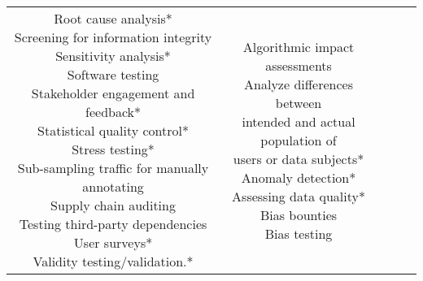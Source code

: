 \documentclass[fleqn]{article}
\begin{document}
\begin{landscape}
\begin{table}[H]
\begin{tabular}{|c|c|c|c|c|}
{			\textbullet\hspace{3pt} Root cause analysis*\\ 
			\textbullet\hspace{3pt} Screening for information integrity \\ 
			\textbullet\hspace{3pt} Sensitivity analysis*\\ 
			\textbullet\hspace{3pt} Software testing \\ 
			\textbullet\hspace{3pt} Stakeholder engagement and feedback*\\ 
			\textbullet\hspace{3pt} Statistical quality control*\\ 
			\textbullet\hspace{3pt} Stress testing*\\ 
			\textbullet\hspace{3pt} Sub-sampling traffic for manually annotating \\ 
			\textbullet\hspace{3pt} Supply chain auditing \\ 
			\textbullet\hspace{3pt} Testing third-party dependencies \\ 
			\textbullet\hspace{3pt} User surveys*\\ 
			\textbullet\hspace{3pt} Validity testing/validation.* \\	
		}	
		&
		\makecell[l]{ 	
			\textbullet\hspace{3pt} Algorithmic impact assessments\\  	
			\textbullet\hspace{3pt} Analyze differences between \\\hspace{10pt}intended and actual population of \\\hspace{10pt}users or data subjects*\\ 	
			\textbullet\hspace{3pt} Anomaly detection*\\  	
			\textbullet\hspace{3pt} Assessing data quality*\\  	
			\textbullet\hspace{3pt} Bias bounties\\  	
			\textbullet\hspace{3pt} Bias testing\\  	
}
\end{tabular}
\end{table}
\end{landscape}
\end{document}
